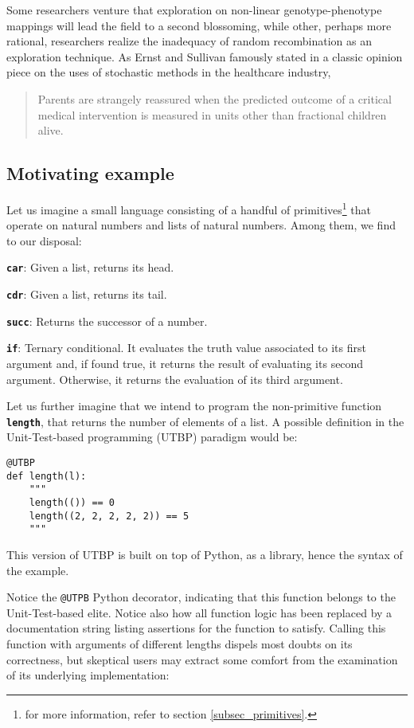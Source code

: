 \documentclass[12pt,twocolumn]{article}
\begin{document}
Some researchers venture that exploration on non-linear genotype-phenotype mappings will lead the field to a second blossoming, while other, perhaps more rational, researchers realize the inadequacy of random recombination as an exploration technique. As Ernst and Sullivan famously stated in a classic opinion piece\cite{ErnstSullivan1998} on the uses of stochastic methods in the healthcare industry,
\begin{quote}
    Parents are strangely reassured when the predicted outcome of a critical medical intervention is measured in units other than fractional children alive.
\end{quote}

\subsection{Motivating example}\label{subsection_motivating_example}
Let us imagine a small language consisting of a handful of primitives\footnote{for more information, refer to section \ref{subsec_primitives}.} that operate on natural numbers and lists of natural numbers. Among them, we find to our disposal:

\texttt{\textbf{car}}: Given a list, returns its head.

\texttt{\textbf{cdr}}: Given a list, returns its tail.

\texttt{\textbf{succ}}: Returns the successor of a number.

\texttt{\textbf{if}}: Ternary conditional. It evaluates the truth value associated to its first argument and, if found true, it returns the result of evaluating its second argument. Otherwise, it returns the evaluation of its third argument.

Let us further imagine that we intend to program the non-primitive function \texttt{\textbf{length}}, that returns the number of elements of a list. A possible definition in the Unit-Test-based programming (UTBP) paradigm would be:

\begin{verbatim}
@UTBP
def length(l):
    """
    length(()) == 0
    length((2, 2, 2, 2, 2)) == 5
    """
\end{verbatim}

This version of UTBP is built on top of Python, as a library, hence the syntax of the example. 

Notice the {\color{purple2} \texttt{@UTPB}} Python decorator, indicating that this function belongs to the Unit-Test-based elite. Notice also how all function logic has been replaced by a documentation string listing assertions for the function to satisfy. Calling this function with arguments of different lengths dispels most doubts on its correctness, but skeptical users may extract some comfort from the examination of its underlying implementation:
\end{document}
